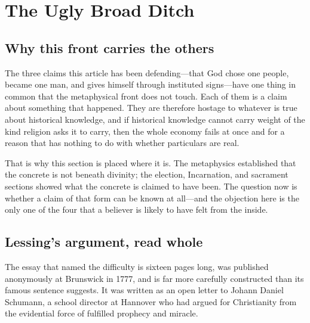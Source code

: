 \section{The Ugly Broad Ditch}

\subsection{Why this front carries the others}

The three claims this article has been defending---that God chose one people, became one man, and gives himself through instituted signs---have one thing in common that the metaphysical front does not touch. Each of them is a claim about something that happened. They are therefore hostage to whatever is true about historical knowledge, and if historical knowledge cannot carry weight of the kind religion asks it to carry, then the whole economy fails at once and for a reason that has nothing to do with whether particulars are real.

That is why this section is placed where it is. The metaphysics established that the concrete is not beneath divinity; the election, Incarnation, and sacrament sections showed what the concrete is claimed to have been. The question now is whether a claim of that form can be known at all---and the objection here is the only one of the four that a believer is likely to have felt from the inside.

\subsection{Lessing's argument, read whole}

The essay that named the difficulty is sixteen pages long, was published anonymously at Brunswick in 1777, and is far more carefully constructed than its famous sentence suggests. It was written as an open letter to Johann Daniel Schumann, a school director at Hannover who had argued for Christianity from the evidential force of fulfilled prophecy and miracle.

